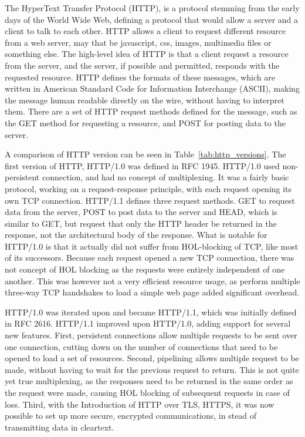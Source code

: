 \documentclass[english, 12pt, a4paper, elec, utf8, a-2b, online]{aaltothesis}
\begin{document}
The HyperText Transfer Protocol (HTTP), is a protocol stemming from the early days 
of the World Wide Web, defining a protocol that would allow a server and a client
to talk to each other. HTTP allows a client to request different resource from a 
web server, may that be javascript, css, images, multimedia files or something else.
The high-level idea of HTTP is that a client request a resource from the server,
and the server, if possible and permitted, responds with the requested resource.
HTTP defines the formats of these messages, which are written in American Standard Code for Information Interchange (ASCII),
making the message human readable directly on the wire, without having to interpret 
them. There are a set of HTTP request methods defined for the message, such as
the GET method for requesting a resource, and POST for posting data to the server\cite{compute_rnetworking}.

A comparison of HTTP version can be seen in Table~\ref{tab:http_versions}. 
The first version of HTTP, HTTP/1.0 was defined in RFC 1945\cite{rfc1945}. HTTP/1.0
used non-persistent connection, and had no concept of multiplexing. It was a fairly
basic protocol, working on a request-response principle, with each request opening
its own TCP connection. HTTP/1.1 defines three request methods. GET to request data
from the server, POST to post data to the server and HEAD, which is similar to GET,
but request that only the HTTP header be returned in the response, not the architectural
body of the response\cite{rfc1945}. What is notable for HTTP/1.0 is that it actually
did not suffer from HOL-blocking of TCP, like most of its successors. Because each
request opened a new TCP connection, there was not concept of HOL blocking as the
requests were entirely independent of one another. This was however not a very efficient
resource usage, as perform multiple three-way TCP handshakes to load a simple web page
added significant overhead. 

HTTP/1.0 was iterated upon and became HTTP/1.1, which was initially defined in
RFC 2616\cite{rfc2616}. HTTP/1.1 improved upon HTTP/1.0, adding support for several
new features. First, persistent connections allow multiple requests to be sent over one connection,
cutting down on the number of connections that need to be opened to load a set of resources.
Second, pipelining allows multiple request to be made, without having to wait for the
previous request to return. This is not quite yet true multiplexing, as the responses
need to be returned in the same order as the request were made, causing HOL blocking
of subsequent requests in case of loss\cite{rfc2616}. Third, with the Introduction
of HTTP over TLS, HTTPS, it was now possible to set up more secure, encrypted communications,
in stead of transmitting data in cleartext\cite{rfc2818}.
\end{document}
